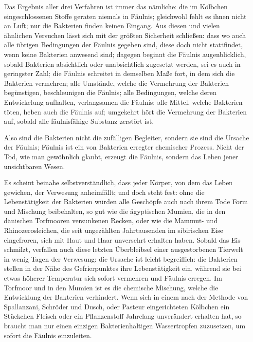 \documentclass[a4paper, 11pt, oneside, english]{article}
\begin{document}
Das Ergebnis aller drei Verfahren ist immer das nämliche: die im Kölbchen eingeschlossenen Stoffe geraten niemals in Fäulnis; gleichwohl fehlt es ihnen nicht an Luft; nur die Bakterien finden keinen Eingang. Aus diesen und vielen ähnlichen Versuchen lässt sich mit der größten Sicherheit schließen: dass wo auch alle übrigen Bedingungen der Fäulnis gegeben sind, diese doch nicht stattfindet, wenn keine Bakterien anwesend sind; dagegen beginnt die Fäulnis augenblicklich, sobald Bakterien absichtlich oder unabsichtlich zugesetzt werden, sei es auch in geringster Zahl; die Fäulnis schreitet in demselben Maße fort, in dem sich die Bakterien vermehren; alle Umstände, welche die Vermehrung der Bakterien begünstigen, beschleunigen die Fäulnis; alle Bedingungen, welche deren Entwickelung aufhalten, verlangsamen die Fäulnis; alle Mittel, welche Bakterien töten, heben auch die Fäulnis auf; umgekehrt hört die Vermehrung der Bakterien auf, sobald alle fäulnisfähige Substanz zerstört ist.

Also sind die Bakterien nicht die zufälligen Begleiter, sondern sie sind die Ursache der Fäulnis; Fäulnis ist ein von Bakterien erregter chemischer Prozess. Nicht der Tod, wie man gewöhnlich glaubt, erzeugt die Fäulnis, sondern das Leben jener unsichtbaren Wesen.

Es scheint beinahe selbstverständlich, dass jeder Körper, von dem das Leben gewichen, der Verwesung anheimfällt; und doch steht fest: ohne die Lebenstätigkeit der Bakterien würden alle Geschöpfe auch nach ihrem Tode Form und Mischung beibehalten, so gut wie die ägyptischen Mumien, die in den dänischen Torfmooren versunkenen Recken, oder wie die Mammut- und Rhinozerosleichen, die seit ungezählten Jahrtausenden im sibirischen Eise eingefroren, sich mit Haut und Haar unversehrt erhalten haben. Sobald das Eis schmilzt, verfallen auch diese letzten Überbleibsel einer ausgestorbenen Tierwelt in wenig Tagen der Verwesung: die Ursache ist leicht begreiflich: die Bakterien stellen in der Nähe des Gefrierpunktes ihre Lebenstätigkeit ein, während sie bei etwas höherer Temperatur sich sofort vermehren und Fäulnis erregen. Im Torfmoor und in den Mumien ist es die chemische Mischung, welche die Entwicklung der Bakterien verhindert. Wenn sich in einem nach der Methode von Spallanzani, Schröder und Dusch, oder Pasteur eingerichteten Kölbchen ein Stückchen Fleisch oder ein Pflanzenstoff Jahrelang unverändert erhalten hat, so braucht man nur einen einzigen Bakterienhaltigen Wassertropfen zuzusetzen, um sofort die Fäulnis einzuleiten.
\end{document}
